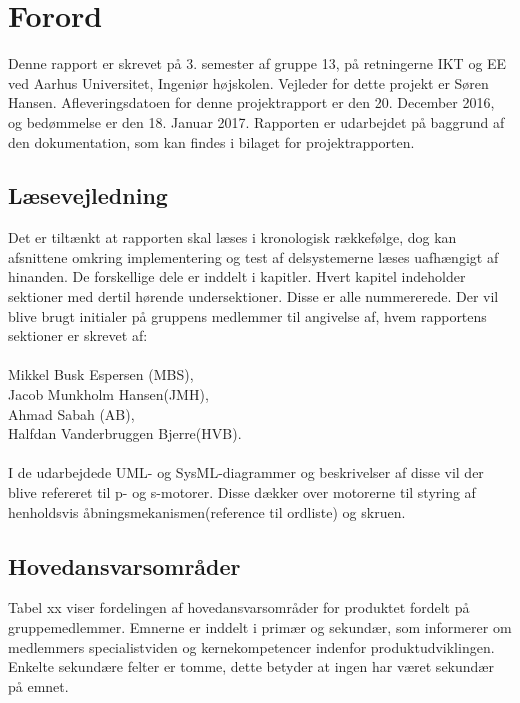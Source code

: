 \chapter{Forord}
Denne rapport er skrevet på 3. semester af gruppe 13, på retningerne IKT og EE ved Aarhus Universitet, Ingeniør højskolen. 
Vejleder for dette projekt er Søren Hansen. Afleveringsdatoen for denne projektrapport er den 20. December 2016, og bedømmelse er den 18. Januar 2017.
Rapporten er udarbejdet på baggrund af den dokumentation, som kan findes i bilaget for projektrapporten.

\section{Læsevejledning}
Det er tiltænkt at rapporten skal læses i kronologisk rækkefølge, dog kan afsnittene omkring implementering og test af delsystemerne læses
uafhængigt af hinanden. De forskellige dele er inddelt i kapitler. Hvert kapitel indeholder sektioner med dertil hørende undersektioner. Disse er alle nummererede.
Der vil blive brugt initialer på gruppens medlemmer til angivelse af, hvem rapportens sektioner er skrevet af: \\
\\
Mikkel Busk Espersen (MBS), \\
Jacob Munkholm Hansen(JMH), \\
Ahmad Sabah (AB), \\
Halfdan Vanderbruggen Bjerre(HVB). \\
\\
I de udarbejdede UML- og SysML-diagrammer og beskrivelser af disse vil der blive refereret til p- og s-motorer. Disse dækker over motorerne til styring af 
henholdsvis åbningsmekanismen(reference til ordliste) og skruen.

\section{Hovedansvarsområder}
Tabel xx viser fordelingen af hovedansvarsområder for produktet fordelt på gruppemedlemmer. Emnerne er inddelt i primær og sekundær, som informerer om 
medlemmers specialistviden og kernekompetencer indenfor produktudviklingen. Enkelte sekundære felter er tomme, dette betyder at ingen har været sekundær på 
emnet.\\

